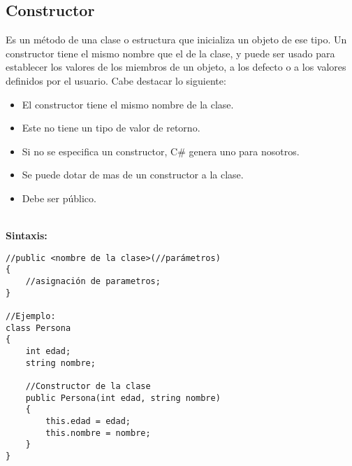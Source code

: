 \documentclass[letterpaper, 12pt]{article}
\begin{document}
\begin{justify}
        \subsection{Constructor}
        Es un método de una clase o estructura que inicializa un objeto de ese tipo. Un constructor tiene el mismo nombre que el de la clase, y puede
        ser usado para establecer los valores de los miembros de un objeto, a los defecto o a los valores definidos por el usuario. Cabe destacar lo siguiente:
        \begin{itemize}
            \item El constructor tiene el mismo nombre de la clase.
            \item Este no tiene un tipo de valor de retorno.
            \item Si no se especifica un constructor, C\# genera uno para nosotros.
            \item Se puede dotar de mas de un constructor a la clase.
            \item Debe ser público.
        \end{itemize}
        \textbf{\\Sintaxis:}
            \begin{verbatim}
//public <nombre de la clase>(//parámetros)
{
    //asignación de parametros;
}

//Ejemplo:
class Persona
{
    int edad;
    string nombre;

    //Constructor de la clase
    public Persona(int edad, string nombre)
    {
        this.edad = edad;
        this.nombre = nombre;
    }
}
            \end{verbatim}

\end{justify}
\end{document}
